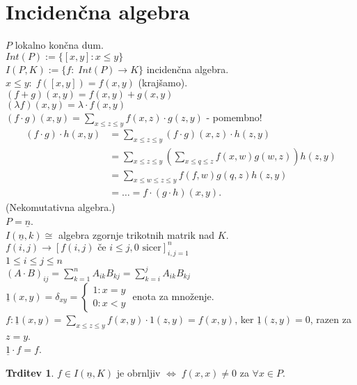 \documentclass[a4paper, 12pt]{book}
\theoremstyle{definition}
\newtheorem{claim}[counter]{Trditev}
\theoremstyle{remark}
\begin{document}
\section{Incidenčna algebra}

$P$ lokalno končna dum. \\
$Int(P) := \{[x,y]: x \leq y\}$ \\
$I(P, K) := \{f: \; Int(P) \to K\}$ incidenčna algebra. \\
$x \leq y: \; f([x,y]) = f(x,y)$ (krajšamo). \\
$(f+g)(x,y) = f(x,y) + g(x,y)$ \\
$(\lambda f)(x,y) = \lambda \cdot f(x,y)$ \\
$(f \cdot g)(x,y) = \sum_{x \leq z \leq y} f(x,z) \cdot g(z,y)$ - pomembno! \\
\begin{align*}
  (f \cdot g) \cdot h(x,y) &= \sum_{x \leq z \leq y} (f \cdot g)(x,z) \cdot h(z,y) \\
  &= \sum_{x \leq z \leq y} \left(\sum_{x \leq q \leq z} f(x,w) g(w,z)\right) h(z,y) \\
  &= \sum_{x \leq w \leq z \leq y} f(f,w) g(q,z) h(z,y) \\
  &= \dots = f \cdot (g \cdot h)(x,y).
\end{align*}
(Nekomutativna algebra.) \\
$P = \underline{n}$. \\
$I(\underline{n}, k) \cong$ algebra zgornje trikotnih matrik nad $K$. \\
$f(i,j) \to \left[f(i,j) \text{ če } i \leq j, 0 \text{ sicer}\right]_{i,j=1}^n$ \\
$1 \leq i \leq j \leq n$ \\
$(A \cdot B)_{ij} = \sum_{k=1}^{n} A_{ik} B_{kj} = \sum_{k=i}^{j} A_{ik} B_{kj}$ \\
$\underline{1}(x,y) = \delta_{xy} = \begin{cases}
  1: x = y \\
  0: x < y
\end{cases}$ enota za množenje. \\
$f: \underline{1}(x,y) = \sum_{x \leq z \leq y} f(x,y) \cdot 1(z,y) = f(x,y)$, ker
$\underline{1}(z,y) = 0$, razen za $z = y$. \\
$\underline{1} \cdot f = f$.
\begin{claim}
  $f \in I(\underline{n}, K)$ je obrnljiv $\iff \; f(x,x) \neq 0$ za $\forall x \in P$.
\end{claim}
\end{document}
